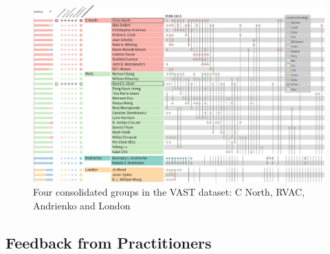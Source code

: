 \begin{figure}[!ht]
\centering
\includegraphics[width=\linewidth]{static/figures/PK-Clustering/VISPaperFigures/vast_some_consolidated_groups.png}
\caption{Four consolidated groups in the VAST dataset: C North, RVAC, Andrienko and London}
\label{fig:PK-vast_some_consolidated_groups}
\end{figure}





\subsection{Feedback from Practitioners}

